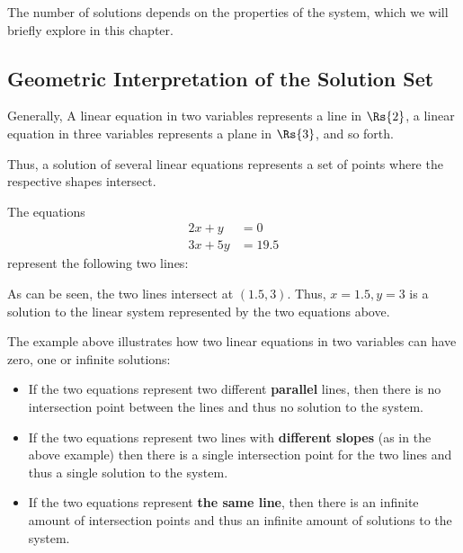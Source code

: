 The number of solutions depends on the properties of the system, which we will briefly explore in this chapter.

\subsection{Geometric Interpretation of the Solution Set}
Generally, A linear equation in two variables represents a line in $\Rs{2}$, a linear equation in three variables represents a plane in $\Rs{3}$, and so forth.

Thus, a solution of several linear equations represents a set of points where the respective shapes intersect.

\begin{example}
  The equations
  \begin{align*}
  2x+y&=0\\
  3x+5y&=19.5
  \end{align*}
  represent the following two lines:
  \begin{figure}[H]
  \centering
  \end{figure}
  
  As can be seen, the two lines intersect at $\left( 1.5, 3 \right)$. Thus, $x=1.5, y=3$ is a solution to the linear system represented by the two equations above.
\end{example}

The example above illustrates how two linear equations in two variables can have zero, one or infinite solutions:
\begin{itemize}
  \item If the two equations represent two different \textbf{parallel} lines, then there is no intersection point between the lines and thus no solution to the system.
  \item If the two equations represent two lines with \textbf{different slopes} (as in the above example) then there is a single intersection point for the two lines and thus a single solution to the system.
  \item If the two equations represent \textbf{the same line}, then there is an infinite amount of intersection points and thus an infinite amount of solutions to the system.
\end{itemize}

